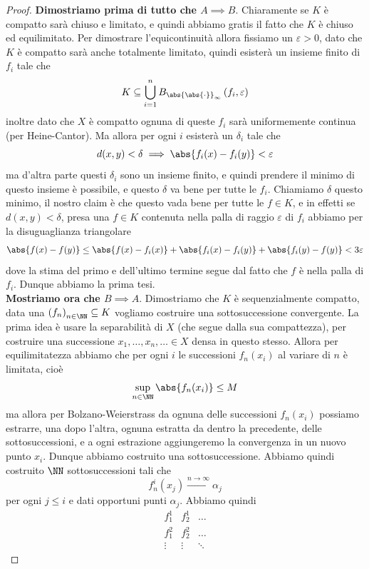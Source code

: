 \documentclass[11pt]{scrartcl}
\begin{document}
	\begin{proof}
		\textbf{Dimostriamo prima di tutto che $A\implies B$}. Chiaramente se $K$ è compatto sarà chiuso e limitato, e quindi abbiamo gratis il fatto che $K$ è chiuso ed equilimitato. Per dimostrare l'equicontinuità allora fissiamo un $\varepsilon>0$, dato che $K$ è compatto sarà anche totalmente limitato, quindi esisterà un insieme finito di $f_i$ tale che
		$$K\subseteq \bigcup_{i=1}^n B_{\abs{\abs{\cdot}}_\infty}\left(f_i,\varepsilon\right)$$
		inoltre dato che $X$ è compatto ognuna di queste $f_i$ sarà uniformemente continua (per Heine-Cantor). Ma allora per ogni $i$ esisterà un $\delta_i$ tale che
		$$d(x,y)<\delta \implies \abs{f_i(x)-f_i(y)}<\varepsilon$$
		ma d'altra parte questi $\delta_i$ sono un insieme finito, e quindi prendere il minimo di questo insieme è possibile, e questo $\delta$ va bene per tutte le $f_i$. Chiamiamo $\delta$ questo minimo, il nostro claim è che questo vada bene per tutte le $f\in K$, e in effetti se $d(x,y)<\delta$, presa una $f\in K$ contenuta nella palla di raggio $\varepsilon$ di $f_i$ abbiamo per la disuguaglianza triangolare
		$$\abs{f(x)-f(y)}\le \abs{f(x)-f_i(x)}+\abs{f_i(x)-f_i(y)}+\abs{f_i(y)-f(y)}< 3\varepsilon$$
		dove la stima del primo e dell'ultimo termine segue dal fatto che $f$ è nella palla di $f_i$. Dunque abbiamo la prima tesi. \\
		\textbf{Mostriamo ora che $B\implies A$}. Dimostriamo che $K$ è sequenzialmente compatto, data una $\left(f_n\right)_{n\in\NN}\subseteq K$ vogliamo costruire una sottosuccessione convergente. La prima idea è usare la separabilità di $X$ (che segue dalla sua compattezza), per costruire una successione $x_1,\dots,x_n,\dots \in X$ densa in questo stesso. Allora per equilimitatezza abbiamo che per ogni $i$ le successioni $f_n(x_i)$ al variare di $n$ è limitata, cioè
		$$\sup_{n\in\NN}\abs{f_n(x_i)}\le M$$
		ma allora per Bolzano-Weierstrass da ognuna delle successioni $f_n(x_i)$ possiamo estrarre, una dopo l'altra, ognuna estratta da dentro la precedente, delle sottosuccessioni, e a ogni estrazione aggiungeremo la convergenza in un nuovo punto $x_i$. Dunque abbiamo costruito una sottosuccessione. Abbiamo quindi costruito $\NN$ sottosuccessioni tali che
		$$f^i_n(x_j)\overset{n\to\infty}{\longrightarrow}\alpha_j$$
		per ogni $j\le i$ e dati opportuni punti $\alpha_j$. Abbiamo quindi
		$$
		\begin{array}{ccc}
			f_1^1 & f_2^1 & \dots \\
			f^2_1 & f^2_2 & \dots \\
			\vdots & \vdots & \ddots

\end{array}$$
\end{proof}
\end{document}
